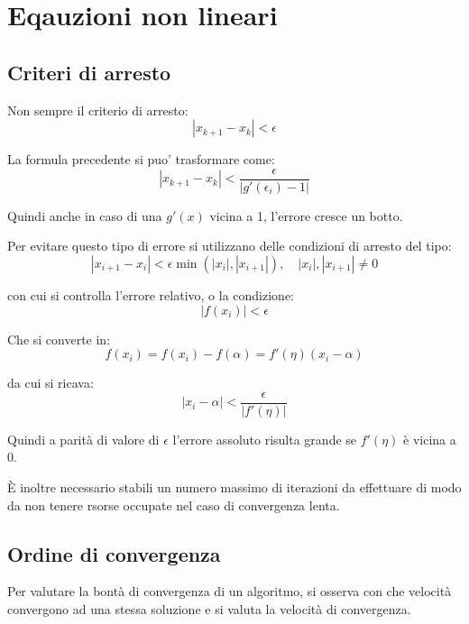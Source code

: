 \chapter{Eqauzioni non lineari}

\section{Criteri di arresto}
Non sempre il criterio di arresto:
\begin{equation*}
  |x_{k+1}-x_k|<\epsilon
\end{equation*}

La formula precedente si puo' trasformare come:
\begin{equation*}
  |x_{k+1}-x_k| < \frac{\epsilon}{|g'(\epsilon_i) - 1|}
\end{equation*}

Quindi anche in caso di una $g'(x)$ vicina a 1, l'errore cresce un botto.

Per evitare questo tipo di errore si utilizzano delle condizioni di arresto del tipo:
\begin{equation}
  |x_{i+1}-x_i| < \epsilon \min(|x_i|, |x_{i+1}|), \quad |x_i|, |x_{i+1}| \neq 0
\end{equation}

con cui si controlla l'errore relativo, o la condizione:
\begin{equation}
  |f(x_i)| < \epsilon
\end{equation}

Che si converte in:
\begin{equation}
  f(x_i) = f(x_i) - f(\alpha) = f'(\eta)(x_i-\alpha)
\end{equation}

da cui si ricava:
\begin{equation}
  |x_i - \alpha| < \frac{\epsilon}{|f'(\eta)|}
\end{equation}

Quindi a parità di valore di $\epsilon$ l'errore assoluto risulta grande se $f'(\eta)$ è vicina a 0.

È inoltre necessario stabili un numero massimo di iterazioni da effettuare di modo da non tenere rsorse occupate
nel caso di convergenza lenta.

\section{Ordine di convergenza}
Per valutare la bontà di convergenza di un algoritmo, si osserva con che velocità convergono ad una stessa 
soluzione e si valuta la velocità di convergenza.

